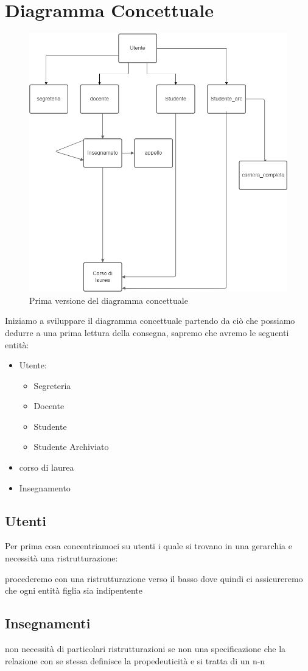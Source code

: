 \section{Diagramma Concettuale}\label{concettuale}
\begin{figure}[ht]
    \centering
    \includegraphics[width=0.5\linewidth]{images/concettuale-1.png}
    \caption{Prima versione del diagramma concettuale}
    \label{fig:concettuale1}
\end{figure}
Iniziamo a sviluppare il diagramma concettuale partendo da ciò che possiamo dedurre a una prima lettura della consegna, sapremo che avremo le  seguenti entità:
\begin{itemize}
    \item Utente:
    \begin{itemize}
        \item Segreteria
        \item Docente
        \item Studente
        \item Studente Archiviato
    \end{itemize}
    \item corso di laurea 
    \item Insegnamento
\end{itemize}

\subsection{Utenti}
Per prima cosa concentriamoci su utenti i quale si trovano in una gerarchia e necessità una ristrutturazione:

procederemo con una ristrutturazione verso il basso dove quindi ci assicureremo che ogni entità figlia sia indipentente
\subsection{Insegnamenti}
non necessità di particolari ristrutturazioni se non una specificazione che la relazione con se stessa definisce la propedeuticità  e si tratta di un n-n
